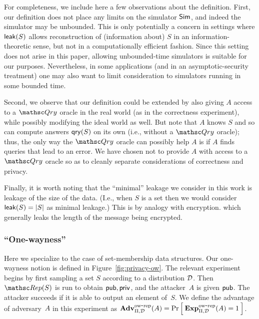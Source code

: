 For completeness, we include here a few observations about the definition.
First, our definition does not place any limits on the simulator ${\sf Sim}$, and indeed
the simulator may be unbounded. This is only potentially a concern in settings
where ${\sf leak}(S)$ allows reconstruction of (information about) $S$ in an information-theoretic
sense, but not in a computationally efficient fashion. Since this setting does not arise
in this paper, allowing unbounded-time simulators is suitable for our purposes. Nevertheless,
in some applications (and in an asymptotic-security treatment) one may also want to limit consideration
to simulators running in some bounded time.

Second, we observe that our definition could be extended by also giving $A$ access to a $\Qry$
oracle in the real world (as in the correctness experiment), while possibly modifying the
ideal world as well. But note that
$A$ knows $S$ and so can compute answers $\mathsf{qry}(S)$ on its own (i.e., without a $\Qry$ oracle);
thus, the only way the $\Qry$ oracle can possibly help $A$ is if $A$ finds queries
that lead to an error.
We have chosen not to provide $A$ with
access to a $\Qry$ oracle so as to cleanly separate considerations
of correctness and privacy.

Finally, it is worth noting that the ``minimal'' leakage we consider in this work
is leakage of the size of the data. (I.e., when $S$ is a set then we would
consider ${\sf leak}(S)=|S|$ as minimal leakage.) This is by analogy with encryption.
which generally leaks the length of the message being encrypted.


\subsubsection{``One-wayness''}

Here we specialize to the case of set-membership data structures.
Our one-wayness notion is defined in Figure~\ref{fig:privacy-ow}.
The relevant experiment begins by first sampling a set $S$ according to a distribution
${\cal D}$. Then $\Rep(S)$ is run to obtain ${\sf pub},{\sf priv}$, and the attacker~$A$ is given
${\sf pub}$. The attacker succeeds if it is able to output an element of~$S$.
We define the advantage of adversary~$A$ in this experiment
as $\mathrm{\mathbf{Adv}}^{\mathrm{ow\mbox{-}rep}}_{\Pi,\mathcal{D}}(A) = \Pr\left[\: \mathrm{\mathbf{Exp}}^{\mathrm{ow\mbox{-}rep}}_{\Pi,{\cal D}}(A)=1 \:\right]$.

